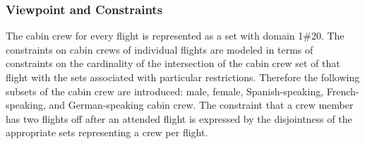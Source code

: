 \documentclass[a4paper]{scrartcl}
\begin{document}
\subsubsection{Viewpoint and Constraints}
The cabin crew for every flight is represented as a set
with domain 1$\#$20. 
The constraints on cabin crews of individual flights are 
modeled in terms of constraints on the cardinality of the 
intersection of the cabin crew set of that flight with the 
sets associated with particular restrictions. Therefore 
the following subsets of the cabin crew are introduced: 
male, female, Spanish-speaking, French-speaking, and 
German-speaking cabin crew. The constraint that a crew 
member has two flights off after an attended flight is 
expressed by the disjointness of the appropriate sets 
representing a crew per flight. 
\end{document}

